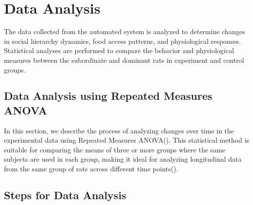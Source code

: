 \documentclass[english, a4paper, 11pt]{article}
\begin{document}
\newpage



\section{Data Analysis}
The data collected from the automated system is analyzed to determine changes in social hierarchy dynamics, food access patterns, and physiological responses.
Statistical analyses are performed to compare the behavior and physiological measures between the subordinate and dominant rats in experiment and control groups.





\subsection*{Data Analysis using Repeated Measures ANOVA}

In this section, we describe the process of analyzing changes over time in the experimental data using Repeated Measures ANOVA(\cite{parkCorrectUseRepeated2009}). This statistical method is suitable for comparing the means of three or more groups where the same subjects are used in each group, making it ideal for analyzing longitudinal data from the same group of rats across different time points(\cite{bauerAnalyzingRepeatedMeasures2013a,hershbergerModelingIntraindividualVariability2013a}).

\subsection*{Steps for Data Analysis}
\end{document}
